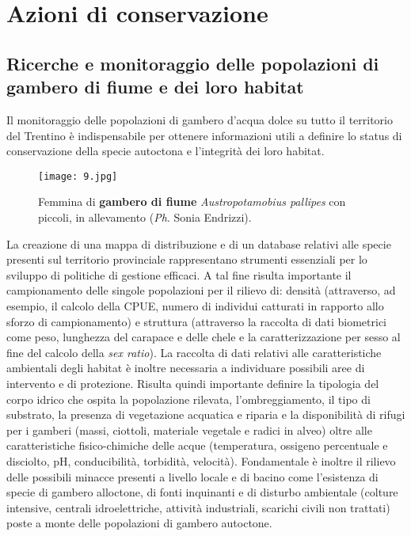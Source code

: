 \documentclass[10pt,twoside,openany,x11names,svgnames,italian,a5paper,dvipsnames,table]{memoir}
\newcommand\chapterillustration{}
\newcommand{\ph}{\emph{Ph}. }
\begin{document}
   
\chapter{Azioni di conservazione}
\renewcommand\chapterillustration{15.jpg}

\section{Ricerche e monitoraggio delle popolazioni di gambero di fiume e dei loro habitat}

Il monitoraggio delle popolazioni di gambero d’acqua dolce su tutto il territorio del Trentino è indispensabile per ottenere informazioni utili a definire lo status di conservazione della specie autoctona e l’integrità dei loro habitat. 

\begin{wrapfigure}[15]{l}{.6\textwidth}
\begin{center}
\vspace{-.8cm}
\texttt{[image: 9.jpg]}
\caption*{Femmina di \textbf{gambero di fiume} \emph{Austropotamobius pallipes} con piccoli, in allevamento (\ph Sonia Endrizzi).}
\end{center}
\end{wrapfigure}
La creazione di una mappa di distribuzione e di un database relativi alle specie presenti sul territorio provinciale rappresentano strumenti essenziali per lo sviluppo di politiche di gestione efficaci. A tal fine risulta importante il campionamento delle singole popolazioni per il rilievo di: densità (attraverso, ad esempio, il calcolo della CPUE, numero di individui catturati in rapporto allo sforzo di campionamento) e struttura (attraverso la raccolta di dati biometrici come peso, lunghezza del carapace e delle chele e la caratterizzazione per sesso al fine del calcolo della \emph{sex ratio}). La raccolta di dati relativi alle caratteristiche ambientali degli habitat è inoltre necessaria a individuare possibili aree di intervento e di protezione. Risulta quindi importante definire la tipologia del corpo idrico che ospita la popolazione rilevata, l’ombreggiamento, il tipo di substrato, la presenza di vegetazione acquatica e riparia e la disponibilità di rifugi per i gamberi (massi, ciottoli, materiale vegetale e radici in alveo) oltre alle caratteristiche fisico-chimiche delle acque (temperatura, ossigeno percentuale e disciolto, pH, conducibilità, torbidità, velocità). Fondamentale è inoltre il rilievo delle possibili minacce presenti a livello locale e di bacino come l’esistenza di specie di gambero alloctone, di fonti inquinanti e di disturbo ambientale (colture intensive, centrali idroelettriche, attività industriali, scarichi civili non trattati) poste a monte delle popolazioni di gambero autoctone.
\end{document}
